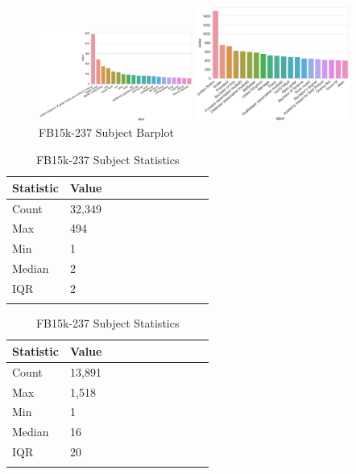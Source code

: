 
\begin{figure}[H]
	\parbox{.5\linewidth}{
   		\centering
    		\includegraphics[width=0.45\textwidth, height=0.2\textheight]{WN18RR_Subject_Counts}
		\caption{WN18RR Subject Barplot}
		}
	\hfill
	\parbox{.5\linewidth}{
   		\centering
		\includegraphics[width=0.45\textwidth, height=0.2\textheight]{FB15k-237_Subject_Counts}
		\caption{FB15k-237 Subject Barplot}
		}
\end{figure}

\begin{table}[H]
	\parbox{.5\linewidth}{
		\centering
		\begin{tabular}{lllllllllll}
  			\textbf{Statistic} & \textbf{Value}  \\
  			\hline
			Count & 32,349 \\
			Max & 494 \\
			Min & 1 \\
  			Median & 2 \\
  			IQR & 2 \\
			&
		\end{tabular}
		\caption{WN18RR Subject Statistics}
		}
	\hfill
	\parbox{.5\linewidth}{
		\centering
		\begin{tabular}{lllllllllll}
  			\textbf{Statistic} & \textbf{Value}  \\
  			\hline
			Count &13,891 \\
			Max & 1,518 \\
			Min & 1 \\
  			Median & 16 \\
  			IQR & 20 \\
			&
		\end{tabular}
		\caption{FB15k-237 Subject Statistics}
		}
\end{table}

